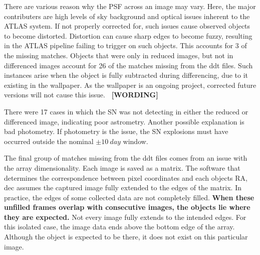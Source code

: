 \indent There are various reason why the PSF across an image may vary.
Here, the major contributers are high levels of sky background and optical 
issues inherent to the ATLAS system. 
If not properly corrected for, such issues cause observed objects to become distorted. 
Distortion can cause sharp edges to become fuzzy, resulting in the ATLAS pipeline 
failing to trigger on such objects. This accounts for 3 of the missing matches.
Objects that were only in reduced images, but not in differenced images account 
for 26 of the matches missing from the ddt files. Such instances arise when the 
object is fully subtracted during differencing, due to it existing in the wallpaper.
As the wallpaper is an ongoing project, corrected future versions will not cause this issue.
{\bf ~[WORDING]}


\indent There were 17 cases in which the SN was not detecting in either the reduced or 
differenced image, indicating poor astrometry. Another possible explanation is 
bad photometry. If photometry is the issue, the SN explosions must have occurred 
outside the nominal $\pm10~day$ window.


\indent The final group of matches missing from the ddt files comes from an issue with 
the array dimensionality. Each image is saved as a matrix. The software that 
determines the correspondence between pixel coordinates and each objects RA, dec 
assumes the captured image fully extended to the edges of the matrix.
In practice, the edges of some collected data are not completely filled. 
{\bf When these unfilled frames overlap with consecutive images, the objects lie where they are expected.} 
Not every image fully extends to the intended edges. 
For this isolated case, the 
image data ends above the bottom edge of the array. Although the object is expected 
to be there, it does not exist on this particular image.


